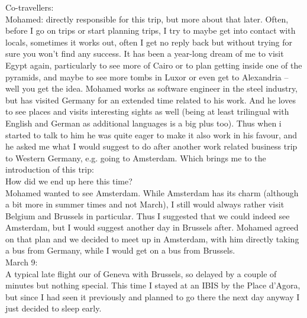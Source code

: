 Co-travellers:\\
Mohamed: directly responsible for this trip, but more about that later. Often, before I go on trips or start planning trips, I try to maybe get into contact with locals, sometimes it works out, often I get no reply back but without trying for sure you won't find any success. It has been a year-long dream of me to visit Egypt again, particularly to see more of Cairo or to plan getting inside one of the pyramids, and maybe to see more tombs in Luxor or even get to Alexandria -- well you get the idea. Mohamed works as software engineer in the steel industry, but has visited Germany for an extended time related to his work. And he loves to see places and visits interesting sights as well (being at least trilingual with English and German as additional languages is a big plus too). Thus when i started to talk to him he was quite eager to make it also work in his favour, and he asked me what I would suggest to do after another work related business trip to Western Germany, e.g. going to Amsterdam. Which brings me to the introduction of this trip:\\

How did we end up here this time?\\
Mohamed wanted to see Amsterdam. While Amsterdam has its charm (although a bit more in summer times and not March), I still would always rather visit Belgium and Brussels in particular. Thus I suggested that we could indeed see Amsterdam, but I would suggest another day in Brussels after. Mohamed agreed on that plan and we decided to meet up in Amsterdam, with him directly taking a bus from Germany, while I would get on a bus from Brussels.\\

March 9:\\
A typical late flight our of Geneva with Brussels, so delayed by a couple of minutes but nothing special. This time I stayed at an IBIS by the Place d'Agora, but since I had seen it previously and planned to go there the next day anyway I just decided to sleep early.\\

